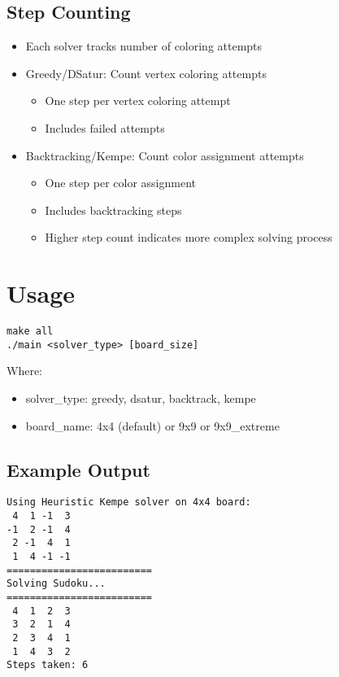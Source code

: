 \documentclass[11pt]{article}
\begin{document}
\subsection{Step Counting}
\label{sec:orge722715}
\begin{itemize}
\item Each solver tracks number of coloring attempts
\item Greedy/DSatur: Count vertex coloring attempts
\begin{itemize}
\item One step per vertex coloring attempt
\item Includes failed attempts
\end{itemize}
\item Backtracking/Kempe: Count color assignment attempts
\begin{itemize}
\item One step per color assignment
\item Includes backtracking steps
\item Higher step count indicates more complex solving process
\end{itemize}
\end{itemize}
\section{Usage}
\label{sec:org0e2f6f0}
\begin{verbatim}
make all
./main <solver_type> [board_size]
\end{verbatim}

Where:
\begin{itemize}
\item solver\_type: greedy, dsatur, backtrack, kempe
\item board\_name: 4x4 (default) or 9x9 or 9x9\_extreme
\end{itemize}
\subsection{Example Output}
\label{sec:org45fedc6}
\begin{verbatim}
Using Heuristic Kempe solver on 4x4 board:
 4  1 -1  3 
-1  2 -1  4 
 2 -1  4  1 
 1  4 -1 -1 
=========================
Solving Sudoku...
=========================
 4  1  2  3 
 3  2  1  4 
 2  3  4  1 
 1  4  3  2 
Steps taken: 6
\end{verbatim}
\end{document}
